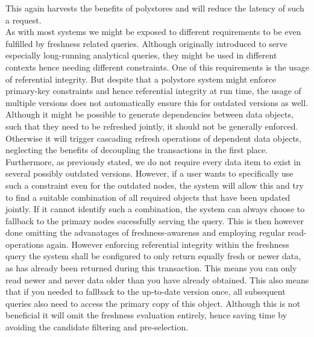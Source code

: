 This again harvests the benefits of polystores and will reduce the latency of such a request.\\
As with most systems we might be exposed to different requirements to be even fulfilled by freshness related queries. 
Although originally introduced to serve especially long-running analytical queries, they might be used in different contexts hence needing different constraints.
One of this requirements is the usage of referential integrity.
But despite that a polystore system might enforce primary-key constraints and hence referential integrity at run time, the usage of multiple versions does not automatically
ensure this for outdated versions as well. Although it might be possible to generate dependencies between data objects, such that they need to be refreshed jointly,
it should not be generally enforced. Otherwise it will trigger cascading refresh operations of dependent data objects, neglecting the benefits of decoupling the transactions 
in the first place. Furthermore, as previously stated, we do not require every data item to exist in several possibly outdated versions.  
However, if a user wants to specifically use such a constraint even for the outdated nodes, the system will allow this and try to find a suitable combination of all required 
objects that have been updated jointly. If it cannot identify such a combination, the system can always choose to fallback to the primary nodes sucessfully serving the query.
This is then however done omitting the advanatages of freshness-awarenss and employing regular read-operations again.
However enforcing referential integrity within the freshness query the system shall be configured to only return equally fresh or newer data, 
as has already been returned during this transaction. This means you can only read newer and never data older than you have already obtained.
This also means that if you needed to fallback to the up-to-date version once, all subsequent queries also need to access the primary copy of this object. 
Although this is not beneficial it will omit the freshness evaluation entirely, hence saving time by avoiding the candidate filtering and pre-selection.

